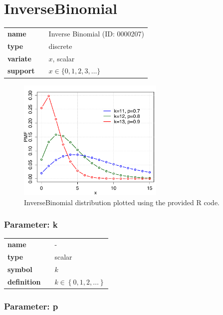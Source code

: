 \section*{InverseBinomial} 

  \bigskip 

\begin{tabular}{p{2cm}cl}
\textbf{name} & & Inverse Binomial (ID: 0000207)\\ 
 
\textbf{type} & & discrete \\ 

\textbf{variate} & & $x$, scalar \\ 

\textbf{support} & & $x \in  \{0,1,2,3,\dots\}$
\end{tabular}

\begin{figure}[ht!]
\centering
  \includegraphics[width=70mm]{pics/InverseBinomial.pdf}
 \caption{InverseBinomial distribution plotted using the provided R code.}
 \label{fig:InverseBinomial}
\end{figure}

\subsubsection*{Parameter: k}

\noindent\begin{tabular}{p{2cm}cl}
\textbf{name} & & - \\
\textbf{type} & & scalar \\
\textbf{symbol} & & $k$  \\
\textbf{definition} & & $k \in \left\{0,1,2,\dots\right\}$
\end{tabular}
\subsubsection*{Parameter: p}

